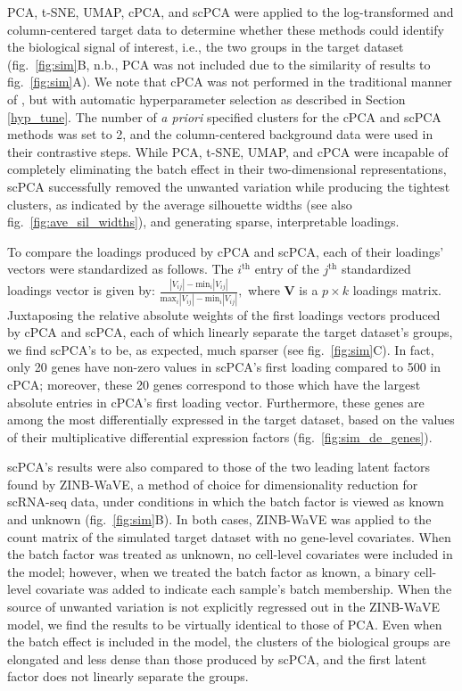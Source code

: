 PCA, t-SNE, UMAP, cPCA, and scPCA were applied to the log-transformed and column-centered target data to determine whether these methods could identify the biological signal of interest, i.e., the two groups in the target dataset (fig.~\ref{fig:sim}B, n.b., PCA was not included due to the similarity of results to fig.~\ref{fig:sim}A). We note that cPCA was not performed in the traditional manner of \citet{Abid2018}, but with automatic hyperparameter selection as described in Section \ref{hyp_tune}. The number of \textit{a priori} specified clusters for the cPCA and scPCA methods was set to 2, and the column-centered background data were used in their contrastive steps. While PCA, t-SNE, UMAP, and cPCA were incapable of completely eliminating the batch effect in their two-dimensional representations, scPCA successfully removed the unwanted variation while producing the tightest clusters, as indicated by the average silhouette widths (see also fig.~\ref{fig:ave_sil_widths}), and generating sparse, interpretable loadings.

To compare the loadings produced by cPCA and scPCA, each of their loadings' vectors were standardized as follows. The $i^{\text{th}}$ entry of the $j^{\text{th}}$ standardized loadings vector is given by: 
$
\frac{|V_{ij}| - \text{min}_i |V_{ij}|}{\text{max}_i |V_{ij}| - \text{min}_i |V_{ij}|},
$
where $\mathbf{V}$ is a $p \times k$ loadings matrix. 
Juxtaposing the relative absolute weights of the first loadings vectors produced by cPCA and scPCA, each of which linearly separate the target dataset's groups, we find scPCA's to be, as expected, much sparser (see fig.~\ref{fig:sim}C). In fact, only 20 genes have non-zero values in scPCA's first loading compared to 500 in cPCA; moreover, these 20 genes correspond to those which have the largest absolute entries in cPCA's first loading vector. Furthermore, these genes are among the most differentially expressed in the target dataset, based on the values of their multiplicative differential expression factors (fig.~\ref{fig:sim_de_genes}).

scPCA's results were also compared to those of the two leading latent factors found by ZINB-WaVE, a method of choice for dimensionality reduction for scRNA-seq data, under conditions in which the batch factor is viewed as known and unknown (fig.~\ref{fig:sim}B). In both cases, ZINB-WaVE was applied to the count matrix of the simulated target dataset with no gene-level covariates. When the batch factor was treated as unknown, no cell-level covariates were included in the model; however, when we treated the batch factor as known, a binary cell-level covariate was added to indicate each sample's batch membership. When the source of unwanted variation is not explicitly regressed out in the ZINB-WaVE model, we find the results to be virtually identical to those of PCA. Even when the batch effect is included in the model, the clusters of the biological groups are elongated and less dense than those produced by scPCA, and the first latent factor does not linearly separate the groups.



